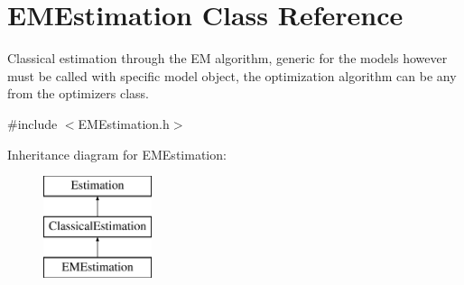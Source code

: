 \hypertarget{classEMEstimation}{}\section{E\+M\+Estimation Class Reference}
\label{classEMEstimation}


Classical estimation through the E\+M algorithm, generic for the models however must be called with specific model object, the optimization algorithm can be any from the optimizers class.  




{\ttfamily \#include $<$E\+M\+Estimation.\+h$>$}

Inheritance diagram for E\+M\+Estimation\+:\begin{figure}[H]
\begin{center}
\leavevmode
\includegraphics[height=3.000000cm]{classEMEstimation}
\end{center}
\end{figure}
